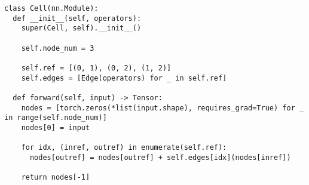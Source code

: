 \documentclass[twocolumn]{jarticle}     %
\begin{document}
\begin{lstlisting}[caption=Cell,label=Cell]
class Cell(nn.Module):
  def __init__(self, operators):
    super(Cell, self).__init__()

    self.node_num = 3

    self.ref = [(0, 1), (0, 2), (1, 2)]
    self.edges = [Edge(operators) for _ in self.ref]

  def forward(self, input) -> Tensor:
    nodes = [torch.zeros(*list(input.shape), requires_grad=True) for _ in range(self.node_num)]
    nodes[0] = input

    for idx, (inref, outref) in enumerate(self.ref):
      nodes[outref] = nodes[outref] + self.edges[idx](nodes[inref])

    return nodes[-1]
\end{lstlisting}




\end{document}
